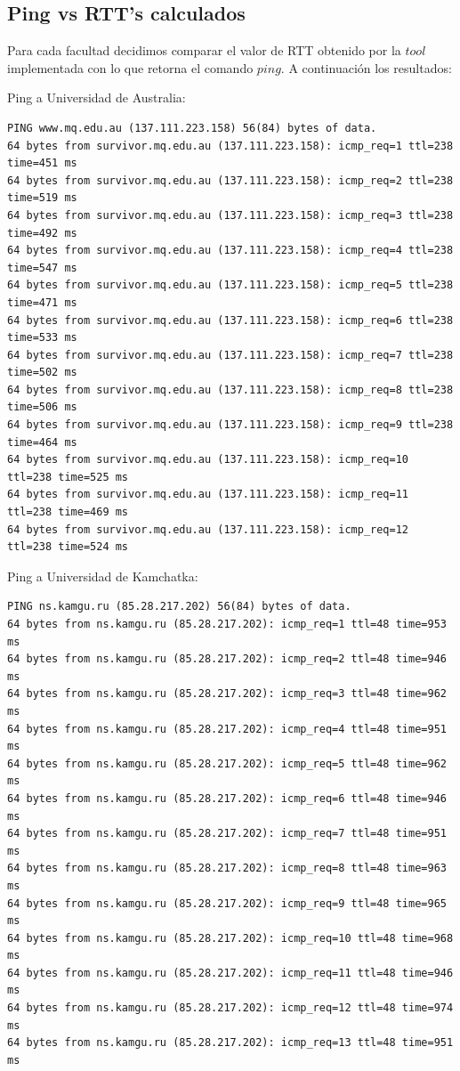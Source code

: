 

\subsection{Ping vs RTT's calculados}

Para cada facultad decidimos comparar el valor de RTT obtenido por la $tool$ implementada con lo que retorna el comando $ping$. A continuación los resultados:

Ping a Universidad de Australia:
\begin{verbatim}
PING www.mq.edu.au (137.111.223.158) 56(84) bytes of data.
64 bytes from survivor.mq.edu.au (137.111.223.158): icmp_req=1 ttl=238 time=451 ms
64 bytes from survivor.mq.edu.au (137.111.223.158): icmp_req=2 ttl=238 time=519 ms
64 bytes from survivor.mq.edu.au (137.111.223.158): icmp_req=3 ttl=238 time=492 ms
64 bytes from survivor.mq.edu.au (137.111.223.158): icmp_req=4 ttl=238 time=547 ms
64 bytes from survivor.mq.edu.au (137.111.223.158): icmp_req=5 ttl=238 time=471 ms
64 bytes from survivor.mq.edu.au (137.111.223.158): icmp_req=6 ttl=238 time=533 ms
64 bytes from survivor.mq.edu.au (137.111.223.158): icmp_req=7 ttl=238 time=502 ms
64 bytes from survivor.mq.edu.au (137.111.223.158): icmp_req=8 ttl=238 time=506 ms
64 bytes from survivor.mq.edu.au (137.111.223.158): icmp_req=9 ttl=238 time=464 ms
64 bytes from survivor.mq.edu.au (137.111.223.158): icmp_req=10 ttl=238 time=525 ms
64 bytes from survivor.mq.edu.au (137.111.223.158): icmp_req=11 ttl=238 time=469 ms
64 bytes from survivor.mq.edu.au (137.111.223.158): icmp_req=12 ttl=238 time=524 ms
\end{verbatim}

Ping a Universidad de Kamchatka:

\begin{verbatim}
PING ns.kamgu.ru (85.28.217.202) 56(84) bytes of data.
64 bytes from ns.kamgu.ru (85.28.217.202): icmp_req=1 ttl=48 time=953 ms
64 bytes from ns.kamgu.ru (85.28.217.202): icmp_req=2 ttl=48 time=946 ms
64 bytes from ns.kamgu.ru (85.28.217.202): icmp_req=3 ttl=48 time=962 ms
64 bytes from ns.kamgu.ru (85.28.217.202): icmp_req=4 ttl=48 time=951 ms
64 bytes from ns.kamgu.ru (85.28.217.202): icmp_req=5 ttl=48 time=962 ms
64 bytes from ns.kamgu.ru (85.28.217.202): icmp_req=6 ttl=48 time=946 ms
64 bytes from ns.kamgu.ru (85.28.217.202): icmp_req=7 ttl=48 time=951 ms
64 bytes from ns.kamgu.ru (85.28.217.202): icmp_req=8 ttl=48 time=963 ms
64 bytes from ns.kamgu.ru (85.28.217.202): icmp_req=9 ttl=48 time=965 ms
64 bytes from ns.kamgu.ru (85.28.217.202): icmp_req=10 ttl=48 time=968 ms
64 bytes from ns.kamgu.ru (85.28.217.202): icmp_req=11 ttl=48 time=946 ms
64 bytes from ns.kamgu.ru (85.28.217.202): icmp_req=12 ttl=48 time=974 ms
64 bytes from ns.kamgu.ru (85.28.217.202): icmp_req=13 ttl=48 time=951 ms
\end{verbatim}

